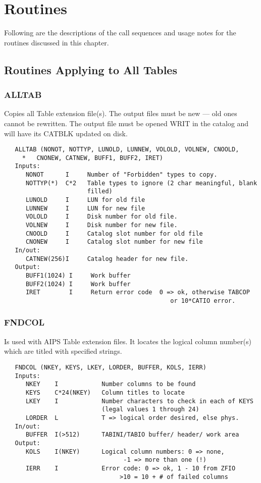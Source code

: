 \section{Routines }

Following are  the descriptions of the call sequences and usage notes
for the routines discussed in this chapter.

\subsection{Routines Applying to All Tables }

\subsubsection{ALLTAB}
Copies all Table extension file(s).  The output files must
be new --- old ones cannot be rewritten.  The output file
must be opened WRIT in the catalog and will have its CATBLK
updated on disk.
\begin{verbatim}
   ALLTAB (NONOT, NOTTYP, LUNOLD, LUNNEW, VOLOLD, VOLNEW, CNOOLD,
     *   CNONEW, CATNEW, BUFF1, BUFF2, IRET)
   Inputs:
      NONOT      I     Number of "Forbidden" types to copy.
      NOTTYP(*)  C*2   Table types to ignore (2 char meaningful, blank
                       filled)
      LUNOLD     I     LUN for old file
      LUNNEW     I     LUN for new file
      VOLOLD     I     Disk number for old file.
      VOLNEW     I     Disk number for new file.
      CNOOLD     I     Catalog slot number for old file
      CNONEW     I     Catalog slot number for new file
   In/out:
      CATNEW(256)I     Catalog header for new file.
   Output:
      BUFF1(1024) I     Work buffer
      BUFF2(1024) I     Work buffer
      IRET        I     Return error code  0 => ok, otherwise TABCOP
                                              or 10*CATIO error.
\end{verbatim}

\subsubsection{FNDCOL}
Is used with AIPS Table extension files.  It locates the
logical column number(s) which are titled with specified strings.
\begin{verbatim}
   FNDCOL (NKEY, KEYS, LKEY, LORDER, BUFFER, KOLS, IERR)
   Inputs:
      NKEY    I            Number columns to be found
      KEYS    C*24(NKEY)   Column titles to locate
      LKEY    I            Number characters to check in each of KEYS
                           (legal values 1 through 24)
      LORDER  L            T => logical order desired, else phys.
   In/out:
      BUFFER  I(>512)      TABINI/TABIO buffer/ header/ work area
   Output:
      KOLS    I(NKEY)      Logical column numbers: 0 => none,
                                 -1 => more than one (!)
      IERR    I            Error code: 0 => ok, 1 - 10 from ZFIO
                                >10 = 10 + # of failed columns
\end{verbatim}


